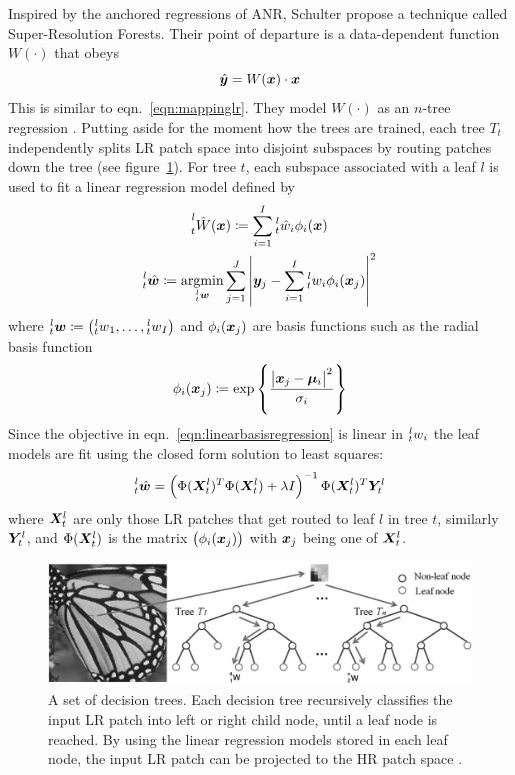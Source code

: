 Inspired by the anchored regressions of ANR, Schulter \etal \cite{Schulter2015} propose a technique called Super-Resolution Forests.
%
Their point of departure is a data-dependent function \(W(\cdot)\) that obeys
\begin{equation}
    \hat{\bm{y}} = W(\bm{x}) \cdot \bm{x}
\end{equation}
This is similar to eqn.~\eqref{eqn:mappinglr}.
%
They model \(W(\cdot)\) as an \(n\)-tree regression .
%
Putting aside for the moment how the trees are trained, each tree \(T_t\) independently splits LR patch space into disjoint subspaces by routing patches down the tree (see figure~\ref{fig:firf}).
%
For tree \(t\), each subspace associated with a leaf \(l\) is used to fit a linear regression model defined by
\begin{gather}
    \prescript{l}{t}{\hat{W}(\bm{x})} \coloneqq \sum_{i=1}^I \prescript{l}{t}{\hat{w}_i}\phi_i(\bm{x}) \\
    \prescript{l}{t}{\hat{\bm{w}}} \coloneqq \underset{\prescript{l}{t}{\bm{w}}}{\text{argmin}} \sum_{j=1}^J \abs{ \bm{y}_j - \sum_{i=1}^I \prescript{l}{t}{w_i}\phi_i(\bm{x}_j) }^2
    \label{eqn:linearbasisregression}
\end{gather}
where \(\prescript{l}{t}{\bm{w}} \coloneqq \left( \prescript{l}{t}{w}_1, \mathellipsis, \prescript{l}{t}{w}_I \right)\) and \(\phi_i(\bm{x}_j)\) are basis functions such as the radial basis function
\begin{equation}
    \phi_i(\bm{x}_j) \coloneqq \exp \left\{ \frac{\abs{ \bm{x}_j - \bm{\mu}_i }^2}{\sigma_i} \right\}
\end{equation}
Since the objective in eqn.~\eqref{eqn:linearbasisregression} is linear in \(\prescript{l}{t}{w}_i\) the leaf models are fit using the closed form solution to least squares:
\begin{equation}
    \prescript{l}{t}{\hat{\bm{w}}} = \left( \Phi(\bm{X}_t^l)^T \Phi(\bm{X}_t^l) + \lambda I \right)^{-1} \Phi(\bm{X}_t^l)^T \bm{Y}_t^l
\end{equation}
where \(\bm{X}_t^l\) are only those LR patches that get routed to leaf \(l\) in tree \(t\), similarly \(\bm{Y}_t^l\), and \(\Phi(\bm{X}_t^l)\) is the matrix \(\left( \phi_i(\bm{x}_j) \right)\) with \(\bm{x}_j\) being one of \(\bm{X}_t^l\).
%
\begin{figure}[!htbp]
    \centering
    \includegraphics[width=\linewidth,keepaspectratio]{figures/classical/FIRF.png}
    \caption{A set of decision trees. Each decision tree recursively classifies the input LR patch into left or right child node, until a leaf node is reached. By using the linear regression models stored in each leaf node, the input LR patch can be projected to the HR patch space \cite{Huang}.}
    \label{fig:firf}
\end{figure}
